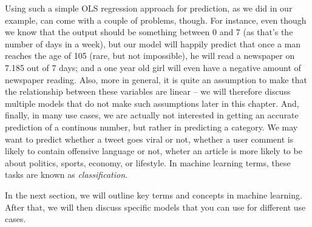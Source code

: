 Using such a simple OLS regression approach for prediction, as we did in our
example, can come with a couple of problems, though.
For instance, even though we know that the output should be something between
0 and 7 (as that's the number of days in a week), but our model will happily
predict that once a man reaches the age of 105 (rare, but not impossible), he
will read a newspaper on 7.185 out of 7 days; and a one year old girl will
even have a negative amount of newspaper reading.
Also, more in general, it is quite an assumption to make that the relationship
between these variables are linear -- we will therefore discuss multiple
models that do not make such assumptions later in this chapter.
And, finally, in many use cases, we are actually not interested in getting
an accurate prediction of a continous number, but rather in predicting a
category. We may want to predict whether a tweet goes viral or not, whether
a user comment is likely to contain offensive language or not, wheter an article
is more likely to be about politics, sports, economy, or lifestyle.
In machine learning terms, these tasks are known as \emph{classification}.

In the next section, we will outline key terms and concepts in machine learning. After that, we will then discuss specific models that you can use for different use cases.
